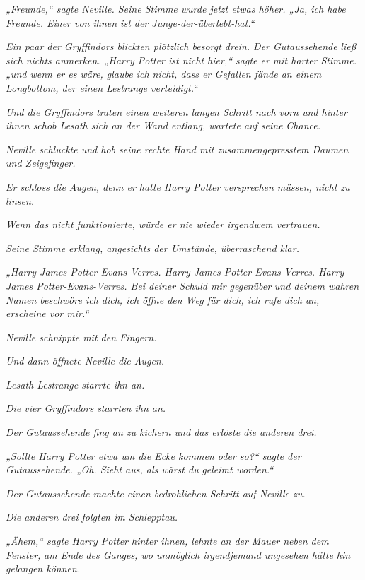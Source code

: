 {\emph{„Freunde,“ sagte Neville. Seine Stimme wurde jetzt etwas höher. „Ja, ich habe Freunde. Einer von ihnen ist der Junge-der-überlebt-hat.“}

\emph{Ein paar der Gryffindors blickten plötzlich besorgt drein. Der Gutaussehende} \emph{ließ sich nichts anmerken. „Harry Potter ist nicht hier,“ sagte er mit harter Stimme. „und wenn er es wäre, glaube ich nicht, dass er Gefallen fände an einem Longbottom, der einen Lestrange verteidigt.“}

\emph{Und die Gryffindors traten einen weiteren langen Schritt nach vorn und hinter ihnen schob Lesath sich an der Wand entlang, wartete auf seine} \emph{Chance.}

\emph{Neville schluckte und hob seine rechte Hand mit zusammengepresstem Daumen und Zeigefinger.}

\emph{Er schloss die Augen, denn er hatte Harry Potter versprechen müssen, nicht zu linsen.}

\emph{Wenn das nicht funktionierte, würde er nie wieder irgendwem vertrauen.}

\emph{Seine Stimme erklang, angesichts der Umstände, überraschend klar.}

\emph{„Harry James Potter-Evans-Verres. Harry James Potter-Evans-Verres. Harry James Potter-Evans-Verres. Bei deiner Schuld mir gegenüber} \emph{und deinem wahren Namen beschwöre ich dich, ich öffne den Weg für dich, ich rufe dich an,} \emph{erscheine vor mir.“}

\emph{Neville schnippte mit den Fingern.}

\emph{Und dann öffnete Neville die Augen.}

\emph{Lesath Lestrange starrte ihn an.}

\emph{Die vier Gryffindors starrten ihn an.}

\emph{Der Gutaussehende fing an zu kichern und das erlöste die anderen drei.}

\emph{„Sollte Harry Potter etwa um die Ecke kommen oder so?“ sagte der Gutaussehende. „Oh. Sieht aus, als wärst du} \emph{geleimt worden.“}

\emph{Der Gutaussehende machte einen bedrohlichen Schritt auf Neville zu.}

\emph{Die anderen drei folgten im Schlepptau.}

\emph{„Ähem,“ sagte Harry Potter hinter ihnen, lehnte an der} \emph{Mauer neben dem Fenster,} \emph{am Ende} \emph{des Ganges, wo unmöglich irgendjemand ungesehen hätte hin gelangen können.}

}
